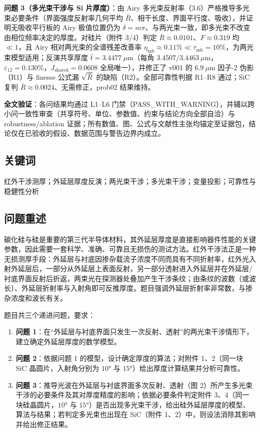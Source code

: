 \textbf{问题 3（多光束干涉与 Si 片厚度）}：由 Airy
多光束反射率（3.6）严格推导多光束必要条件（界面强度反射率几何平均
\(\bar R\)、相干长度、界面平行度、吸收），并证明无吸收平行板的 Airy
极值位置仍为
\(\delta=m\pi\)、与两光束一致，即多光束不改变由相位频率决定的厚度。对硅片（附件
3/4）判定 \(\bar R\approx0.0101\)、\(F\approx0.319\) 均 \(\ll1\)，且
Airy 相对两光束的全谱残差改善率
\(\eta_{\mathrm{mb}}\approx0.11\%\ll\tau_{\mathrm{mb}}=10\%\)，为两光束模型适用；反演共享厚度
\(\hat t=3.4477\ \mu\mathrm{m}\)（每角
\(3.4507/3.4463\ \mu\mathrm{m}\)，\(\varepsilon_{12}=0.130\%\)，\(J_{\mathrm{shared}}=0.0608\)
全局唯一），并修正了 v001 的 \(6.9\ \mu\mathrm{m}\) 因子-2 伪影（R1）与
finesse 公式漏 \(\sqrt{\bar R}\) 的缺陷（R2）。全部可靠性判据 R1--R8
通过；SiC 复判 \(\bar R\approx0.0024\)、无需修正，prob02 结果维持。

\textbf{全文验证}：各问结果均通过 L1--L6
门禁（PASS\_WITH\_WARNING），并辅以跨小问一致性审查（共享符号、单位、参数值、约束与结论方向全部自洽）与
robustness/ablation
证据；所有数值、图、公式与文献性主张均锚定至证据包，结论仅在已验收的假设、数据范围与警告边界内成立。

\subsection{关键词}\label{ux5173ux952eux8bcd}

红外干涉测厚；外延层厚度反演；两光束干涉；多光束干涉；变量投影；可靠性与稳健性分析

\subsection{问题重述}\label{ux95eeux9898ux91cdux8ff0}

碳化硅与硅是重要的第三代半导体材料，其外延层厚度是直接影响器件性能的关键参数，因此需要一套科学、准确、可靠且无损伤的测试方法。红外干涉法正是一种无损测厚手段：外延层与衬底因掺杂载流子浓度不同而具有不同折射率，红外光入射外延层后，一部分从外延层上表面反射，另一部分透射进入外延层并在外延层/衬底界面反射后折返，两束光在探测器处叠加产生干涉条纹；由条纹的波数（或波长）、外延层折射率与入射角即可反推厚度。题目强调外延层折射率非常数，与掺杂浓度和波长有关。

题目共三个递进问题，要求：

\begin{enumerate}
\def\labelenumi{\arabic{enumi}.}
\tightlist
\item
  \textbf{问题
  1}：在``外延层与衬底界面只发生一次反射、透射''的两光束干涉情形下，建立确定外延层厚度的数学模型。
\item
  \textbf{问题 2}：依据问题 1 的模型，设计确定厚度的算法；对附件
  1、2（同一块 SiC 晶圆片，入射角分别为 \(10°\) 与
  \(15°\)）给出厚度计算结果并分析可靠性。
\item
  \textbf{问题 3}：推导光波在外延层与衬底界面多次反射、透射（图
  2）所产生多光束干涉的必要条件及其对厚度精度的影响；依据必要条件判定附件
  3、4（同一块硅晶圆片，\(10°\) 与
  \(15°\)）是否出现多光束干涉，给出硅外延层厚度的模型、算法与结果；若判定多光束也出现在
  SiC（附件 1、2）中，则设法消除其影响并给出修正结果。
\end{enumerate}

